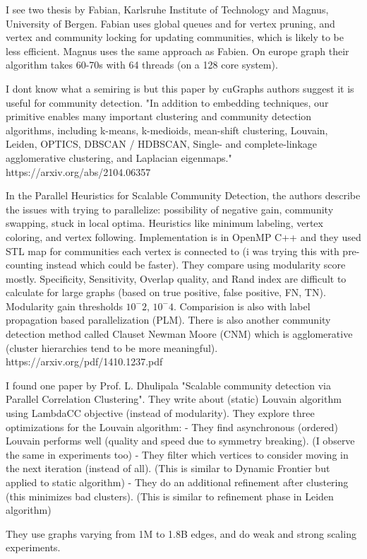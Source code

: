 
I see two thesis by Fabian, Karlsruhe Institute of Technology and Magnus, University of Bergen. Fabian uses global queues and for vertex pruning, and vertex and community locking for updating communities, which is likely to be less efficient. Magnus uses the same approach as Fabien. On europe graph their algorithm takes 60-70s with 64 threads (on a 128 core system).



I dont know what a semiring is but this paper by cuGraphs authors suggest it is useful for community detection.
"In addition to embedding techniques, our primitive enables many important clustering and community detection algorithms, including k-means, k-medioids, mean-shift clustering, Louvain, Leiden, OPTICS, DBSCAN / HDBSCAN, Single- and complete-linkage agglomerative clustering, and Laplacian eigenmaps."
https://arxiv.org/abs/2104.06357


In the Parallel Heuristics for Scalable Community Detection, the authors describe the issues with trying to parallelize: possibility of negative gain, community swapping, stuck in local optima. Heuristics like minimum labeling, vertex coloring, and vertex following. Implementation is in OpenMP C++ and they used STL map for communities each vertex is connected to (i was trying this with pre-counting instead which could be faster). They compare using modularity score mostly. Specificity, Sensitivity, Overlap quality, and Rand index are difficult to calculate for large graphs (based on true positive, false positive, FN, TN). Modularity gain thresholds $10^-2$, $10^-4$. Comparision is also with label propagation based parallelization (PLM). There is also another community detection method called Clauset Newman Moore (CNM) which is agglomerative (cluster hierarchies tend to be more meaningful).
https://arxiv.org/pdf/1410.1237.pdf



I found one paper by Prof. L. Dhulipala "Scalable community detection via Parallel Correlation Clustering". They write about (static) Louvain algorithm using LambdaCC objective (instead of modularity). They explore three optimizations for the Louvain algorithm:
- They find asynchronous (ordered) Louvain performs well (quality and speed due to symmetry breaking).
(I observe the same in experiments too)
- They filter which vertices to consider moving in the next iteration (instead of all).
(This is similar to Dynamic Frontier but applied to static algorithm)
- They do an additional refinement after clustering (this minimizes bad clusters).
(This is similar to refinement phase in Leiden algorithm)


They use graphs varying from 1M to 1.8B edges, and do weak and strong scaling experiments.

